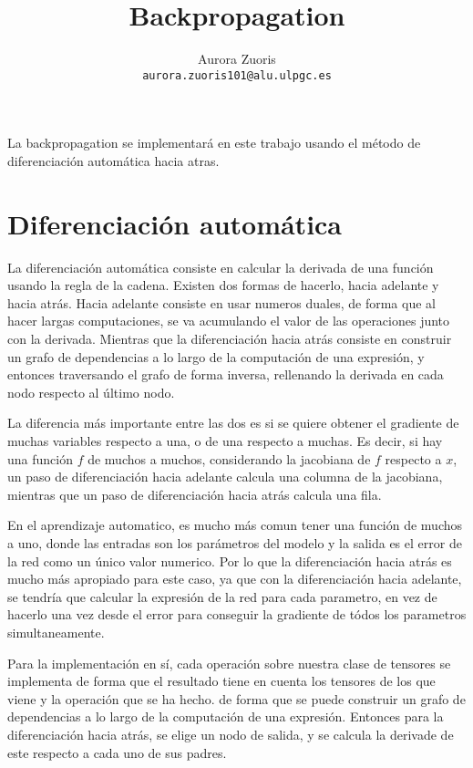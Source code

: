 \documentclass{article}
\title{Backpropagation}
\author{Aurora Zuoris \\ \texttt{aurora.zuoris101@alu.ulpgc.es}}
\begin{document}
\maketitle

La backpropagation se implementará en este trabajo usando el método de diferenciación automática hacia atras.

\section{Diferenciación automática}

La diferenciación automática consiste en calcular la derivada de una función usando la regla de la cadena.
Existen dos formas de hacerlo, hacia adelante y hacia atrás.
Hacia adelante consiste en usar numeros duales, de forma que al hacer largas computaciones,
se va acumulando el valor de las operaciones junto con la derivada.
Mientras que la diferenciación hacia atrás consiste en construir un grafo de dependencias a lo
largo de la computación de una expresión, y entonces traversando el grafo de forma inversa, rellenando
la derivada en cada nodo respecto al último nodo.

La diferencia más importante entre las dos es si se quiere obtener el gradiente de muchas variables respecto a una, o de una respecto a muchas.
Es decir, si hay una función $f$ de muchos a muchos, considerando la jacobiana de $f$ respecto a $x$,
un paso de diferenciación hacia adelante calcula una columna de la jacobiana, mientras que un paso de diferenciación hacia atrás calcula una fila.

En el aprendizaje automatico, es mucho más comun tener una función de muchos a uno, donde las entradas son los parámetros del modelo y la salida es el error de la red como un único valor numerico.
Por lo que la diferenciación hacia atrás es mucho más apropiado para este caso,
ya que con la diferenciación hacia adelante, se tendría que calcular la expresión de la red para cada parametro, en vez de hacerlo una vez desde el error para conseguir la gradiente de tódos los parametros simultaneamente.

\newpage

Para la implementación en sí, cada operación sobre nuestra clase de tensores se implementa de forma que el resultado tiene en cuenta los tensores de los que viene y la operación que se ha hecho.
de forma que se puede construir un grafo de dependencias a lo largo de la computación de una expresión.
Entonces para la diferenciación hacia atrás, se elige un nodo de salida, y se calcula la derivade de este respecto a cada uno de sus padres.
\end{document}

